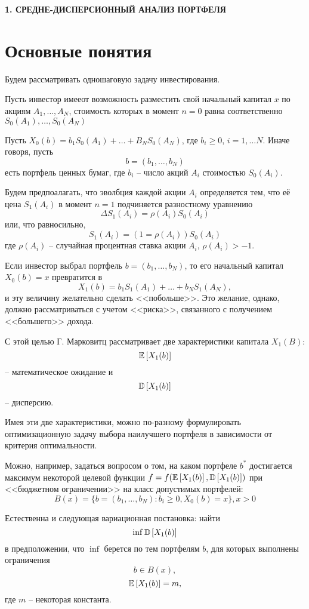 \newpage
\begin{center}
	\textbf{\large 1. СРЕДНЕ-ДИСПЕРСИОННЫЙ АНАЛИЗ ПОРТФЕЛЯ}
\end{center}

\section{Основные понятия}

Будем рассматривать одношаговую задачу инвестирования.

Пусть инвестор имееот возможность разместить свой начальный капитал $x$ по акциям $A_1, \dots, A_N$, стоимость которых 
в момент $n=0$ равна соответственно
$S_0(A_1), \dots, S_0(A_N)$

Пусть $X_0(b) = b_1 S_0(A_1) + \dots + B_N S_0(A_N)$, где $b_i \ge 0$, $i=1, \dots N$. Иначе говоря, пусть
\[
b = (b_1, \dots, b_N )
\]
есть портфель ценных бумаг, где $b_i$ -- число акций $A_i$ стоимостью $S_0(A_i)$.

Будем предпоалагать, что эволбция каждой акции $A_i$ определяется тем, что её цена $S_1(A_i)$ в момент $n=1$ подчиняется 
разностному уравнению
\[
\Delta S_1(A_i) = \rho(A_i) S_0(A_i)
\]
или, что равносильно,
\[
S_1(A_i) = (1 = \rho(A_i))S_0(A_i)
\]
где $\rho(A_i)$ -- случайная процентная ставка акции $A_i$, $\rho(A_i) > -1$.

Если инвестор выбрал портфель $b = (b_1, \dots, b_N )$, то его начальный капитал $X_0(b) = x$ превратится в 
\[
X_1(b) = b_1 S_1(A_1) + \dots + b_N S_1(A_N),
\]
и эту величину желательно сделать <<побольше>>. Это желание, однако, должно рассматриваться с учетом <<риска>>, 
связанного с получением <<большего>> дохода.

С этой целью Г. Марковитц рассматривает две характеристики капитала $X_1(B)$:
\[
\mathbb{E}\left[X_1(b)\right]
\] -- математическое ожидание
и
\[
\mathbb{D}\left[X_1(b)\right]
\] -- дисперсию.

Имея эти две характеристики, можно по-разному формулировать оптимизационную задачу выбора наилучшего портфеля в
зависимости от критерия оптимальности.

Можно, например, задаться вопросом о том, на каком портфеле $b^*$ достигается максимум некоторой целевой функции 
$f = f(\mathbb{E}\left[X_1(b)\right], \mathbb{D}\left[X_1(b)\right])$ при <<бюджетном ограничении>> на класс допустимых портфелей:
\[
B(x) = \{b=(b_1, \dots, b_N): b_i \ge 0, X_0(b) = x\}, x > 0
\]

Естественна и следующая вариационная постановка: найти
\[
\inf \mathbb{D}\left[X_1(b)\right]
\]
в предположении, что $\inf$ берется по тем портфелям $b$, для которых выполнены ограничения
\[
b \in B(x),
\]
\[
\mathbb{E}\left[X_1(b)\right] = m,
\]
где $m$ -- некоторая константа.

